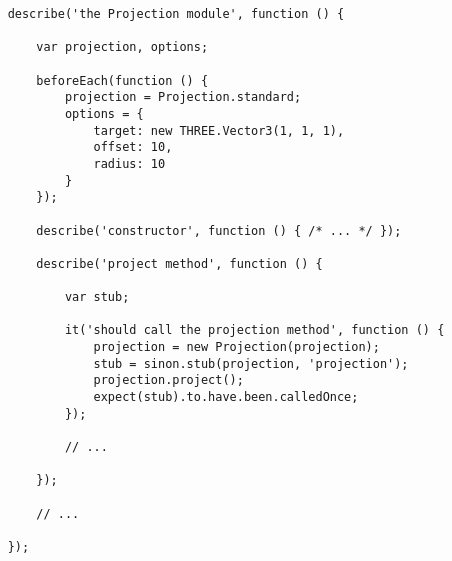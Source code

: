 
\begin{lstlisting}
	describe('the Projection module', function () {

		var projection, options;

		beforeEach(function () {
			projection = Projection.standard;
			options = {
				target: new THREE.Vector3(1, 1, 1),
				offset: 10,
				radius: 10
			}
		});

		describe('constructor', function () { /* ... */ });

		describe('project method', function () {

			var stub;

			it('should call the projection method', function () {
				projection = new Projection(projection);
				stub = sinon.stub(projection, 'projection');
				projection.project();
				expect(stub).to.have.been.calledOnce;
			});

			// ...

		});

		// ...

	});
\end{lstlisting}
